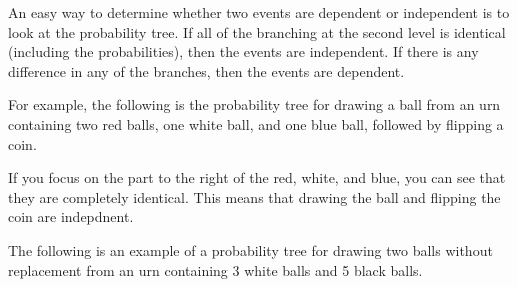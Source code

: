 \documentclass{ximera}
\begin{document}
An easy way to determine whether two events are dependent or independent is to look at the probability tree. If all of the branching at the second level is identical (including the probabilities), then the events are independent. If there is any difference in any of the branches, then the events are dependent.

For example, the following is the probability tree for drawing a ball from an urn containing two red balls, one white ball, and one blue ball, followed by flipping a coin.

\begin{image}
\end{image}

If you focus on the part to the right of the red, white, and blue, you can see that they are completely identical. This means that drawing the ball and flipping the coin are indepdnent.

The following is an example of a probability tree for drawing two balls without replacement from an urn containing 3 white balls and 5 black balls.
\end{document}
